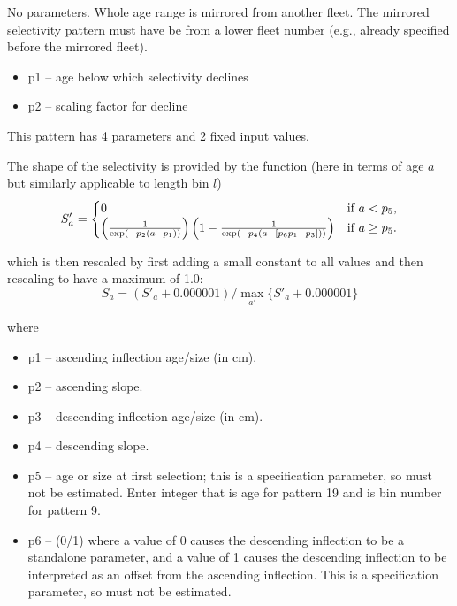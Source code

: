 
No parameters.  Whole age range is mirrored from another fleet. The mirrored selectivity pattern must have be from a lower fleet number (e.g., already specified before the mirrored fleet).

	\begin{itemize}
		\item p1 – age below which selectivity declines
		\item p2 – scaling factor for decline
	\end{itemize}



This pattern has 4 parameters and 2 fixed input values.

The shape of the selectivity is provided by the function (here in terms of age $a$ but similarly applicable to length bin $l$)
  \begin{equation}
    S'_a =  
    \begin{cases}
      \hfil 0 & \text{if $a < p_5$,} \\
      \left( \frac{1}{\exp\left(-p_2 \left( a - p_1 \right) \right) } \right)
      \left(1 - \frac{1}{\exp\left(-p_4 \left( a - [p_6 p_1 - p_3]\right) \right) } \right)
      & \text{if $a \geq p_5$.}
    \end{cases}
  \end{equation}

  which is then rescaled by first adding a small constant to all values and then rescaling to have a maximum of 1.0:
  \begin{equation}
    S_a = (S'_a + 0.000001) / \max_{a'}\{S'_a + 0.000001\}
  \end{equation}

  where
	\begin{itemize}
		\item p1 – ascending inflection age/size (in cm).
		\item p2 – ascending slope. 
		\item p3 – descending inflection age/size (in cm).
		\item p4 – descending slope.
		\item p5 – age or size at first selection; this is a specification parameter, so must not be estimated.  Enter integer that is age for pattern 19 and is bin number for pattern 9.
		\item p6 – (0/1)  where a value of 0 causes the descending inflection to be a standalone parameter, and a value of 1 causes the descending inflection to be interpreted as an offset from the ascending inflection.  This is a specification parameter, so must not be estimated.
	\end{itemize}

